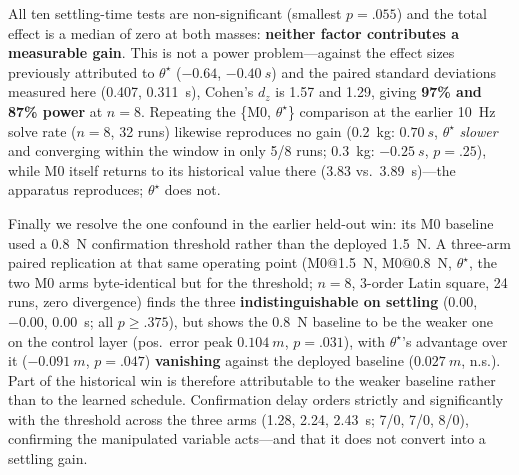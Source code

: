 All ten settling-time tests are non-significant (smallest $p=.055$) and the total effect is a
median of zero at both masses: \textbf{neither factor contributes a measurable gain}. This is
not a power problem---against the effect sizes previously attributed to $\theta^\star$
($-0.64$, $\SI{-0.40}{s}$) and the paired standard deviations measured here (0.407,
\SI{0.311}{s}), Cohen's $d_z$ is 1.57 and 1.29, giving \textbf{97\% and 87\% power} at $n=8$.
Repeating the \{M0, $\theta^\star$\} comparison at the earlier \SI{10}{Hz} solve rate ($n=8$,
32 runs) likewise reproduces no gain (\SI{0.2}{kg}: $\SI{+0.70}{s}$, $\theta^\star$
\emph{slower} and converging within the window in only 5/8 runs; \SI{0.3}{kg}: $\SI{-0.25}{s}$,
$p=.25$), while M0 itself returns to its historical value there (3.83 vs.\ \SI{3.89}{s})---the
apparatus reproduces; $\theta^\star$ does not.

Finally we resolve the one confound in the earlier held-out win: its M0 baseline used a
\SI{0.8}{N} confirmation threshold rather than the deployed \SI{1.5}{N}. A three-arm paired
replication at that same operating point (M0@\SI{1.5}{N}, M0@\SI{0.8}{N}, $\theta^\star$, the
two M0 arms byte-identical but for the threshold; $n=8$, 3-order Latin square, 24 runs, zero
divergence) finds the three \textbf{indistinguishable on settling} ($0.00$, $-0.00$,
\SI{0.00}{s}; all $p\ge.375$), but shows the \SI{0.8}{N} baseline to be the weaker one on the
control layer (pos.\ error peak $\SI{+0.104}{m}$, $p=.031$), with $\theta^\star$'s advantage
over it ($\SI{-0.091}{m}$, $p=.047$) \textbf{vanishing} against the deployed baseline
($\SI{+0.027}{m}$, n.s.). Part of the historical win is therefore attributable to the weaker
baseline rather than to the learned schedule. Confirmation delay orders strictly and
significantly with the threshold across the three arms (1.28, 2.24, \SI{2.43}{s}; 7/0, 7/0,
8/0), confirming the manipulated variable acts---and that it does not convert into a settling
gain.

